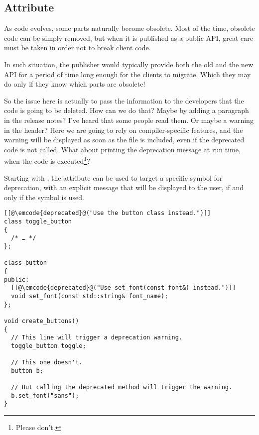 \subsection{\code{[[deprecated]]} Attribute}

\problemtitle

As code evolves, some parts naturally become obsolete. Most of the time,
obsolete code can be simply removed, but when it is published as a
public API, great care must be taken in order not to break client
code.

In such situation, the publisher would typically provide both the old
and the new API for a period of time long enough for the clients to
migrate. Which they may do only if they know which parts are obsolete!

So the issue here is actually to pass the information to the
developers that the code is going to be deleted. How can we do that?
Maybe by adding a paragraph in the release notes? I've heard that some
people read them. Or maybe a warning in the header? Here we are going
to rely on compiler-specific features, and the warning will be
displayed as soon as the file is included, even if the deprecated code
is not called. What about printing the deprecation message at run
time, when the code is executed\footnote{Please don't.}?

\solutiontitle

Starting with , the \code{[[deprecated]]} attribute can be used
to target a specific symbol for deprecation, with an explicit message
that will be displayed to the user, if and only if the symbol is used.

\begin{lstlisting}
[[@\emcode{deprecated}@("Use the button class instead.")]]
class toggle_button
{
  /* … */
};

class button
{
public:
  [[@\emcode{deprecated}@("Use set_font(const font&) instead.")]]
  void set_font(const std::string& font_name);
};

void create_buttons()
{
  // This line will trigger a deprecation warning.
  toggle_button toggle;

  // This one doesn't.
  button b;

  // But calling the deprecated method will trigger the warning.
  b.set_font("sans");
}
\end{lstlisting}

